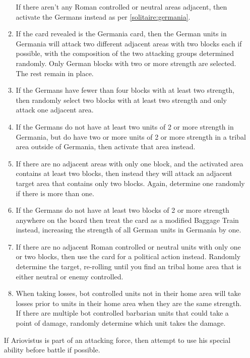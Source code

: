 \begin{enumerate}
\begin{enumerate}[leftmargin=0in]
    If there aren't any Roman controlled or neutral areas adjacent, then activate the Germans instead as per \ref{solitaire:germania}.

    \item \label{solitaire:germania}If the card revealed is the Germania card, then the German units in Germania will attack two different adjacent areas with two blocks each if possible, with the composition of the two attacking groups determined randomly. Only German blocks with two or more strength are selected. The rest remain in place.

    \item If the Germans have fewer than four blocks with at least two strength, then randomly select two blocks with at least two strength and only attack one adjacent area.
    
    \item If the Germans do not have at least two units of 2 or more strength in Germania, but do have two or more units of 2 or more strength in a tribal area outside of Germania, then activate that area instead.

    \item If there are no adjacent areas with only one block, and the activated area contains at least two blocks, then instead they will attack an adjacent target area that contains only two blocks. Again, determine one randomly if there is more than one.
    
    \item If the Germans do not have at least two blocks of 2 or more strength anywhere on the board then treat the card as a modified Baggage Train instead, increasing the strength of all German units in Germania by one.

    \item If there are no adjacent Roman controlled or neutral units with only one or two blocks, then use the card for a political action instead. Randomly determine the target, re-rolling until you find an tribal home area that is either neutral or enemy controlled.
    
    \item When taking losses, bot controlled units not in their home area will take losses prior to units in their home area when they are the same strength. If there are multiple bot controlled barbarian units that could take a point of damage, randomly determine which unit takes the damage.
  \end{enumerate}
  
  If Ariovistus is part of an attacking force, then attempt to use his special ability before battle if possible.


\end{enumerate}
